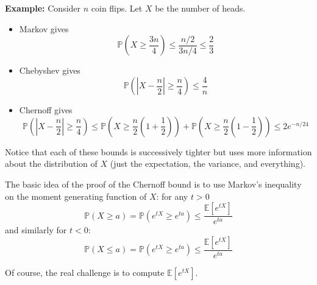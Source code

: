 \documentclass[12pt]{report}
\renewcommand{\P}{\mathbb{P}}
\newcommand{\E}{\mathbb{E}}
\newcommand{\abs}[1]{\left\vert #1 \right\vert}
\newcommand*{\tbf}[1]{\ifmmode\mathbf{#1}\else\textbf{#1}\fi}
\begin{document}
\tbf{Example:} Consider $n$ coin flips. Let $X$ be the number of heads. 
\begin{itemize}
    \item Markov gives 
    \[\P(X \geq \frac{3n}{4} ) \leq \frac{n/2}{3n/4} \leq \frac{2}{3}\]
    \item Chebyshev gives
    \[\P\left(\abs{X - \frac{n}{2}} \geq \frac{n}{4}\right) \leq \frac{4}{n} \]
    \item Chernoff gives
    \[\P\left(\abs{X - \frac{n}{2}} \geq \frac{n}{4}\right) \leq \P\left(X \geq \frac{n}{2}(1 + \frac{1}{2})\right) +\P\left(X \geq \frac{n}{2}(1 - \frac{1}{2})\right) \leq 2e^{-n/24}\]

\end{itemize}

Notice that each of these bounds is successively tighter but uses more information about the distribution of $X$ (just the expectation, the variance, and everything). 

The basic idea of the proof of the Chernoff bound is to use Markov's inequality on the moment generating function of $X$: for any $t > 0$
\[\P(X \geq a) = \P(e^{tX} \ge e^{ta}) \leq \frac{\E[e^{tX}]}{e^{ta}}\]
and similarly for $t < 0$:
\[\P(X \leq a) = \P(e^{tX} \ge e^{ta}) \leq \frac{\E[e^{tX}]}{e^{ta}}\]

Of course, the real challenge is to compute $\E[e^{tX}]$. 
\end{document}
